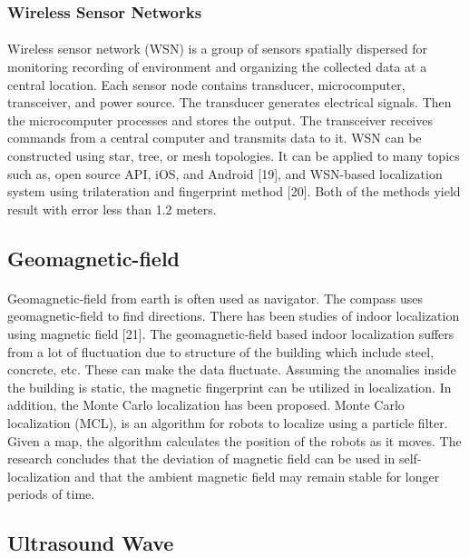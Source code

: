 \subsubsection{Wireless Sensor Networks}
\paragraph{} Wireless sensor network (WSN) is a group of sensors spatially dispersed for monitoring recording of environment and organizing the collected data at a central location. Each sensor node contains transducer, microcomputer, transceiver, and power source. The transducer generates electrical signals. Then the microcomputer processes and stores the output. The transceiver receives commands from a central computer and transmits data to it. WSN can be constructed using star, tree, or mesh topologies. It can be applied to many topics such as, open source API, iOS, and Android [19], and WSN-based localization system using trilateration and fingerprint method [20]. Both of the methods yield result with error less than 1.2 meters.

\subsection{Geomagnetic-field}
\paragraph{} Geomagnetic-field from earth is often used as navigator. The compass uses geomagnetic-field to find directions. There has been studies of indoor localization using magnetic field [21]. The geomagnetic-field based indoor localization suffers from a lot of fluctuation due to structure of the building which include steel, concrete, etc. These can make the data fluctuate. Assuming the anomalies inside the building is static, the magnetic fingerprint can be utilized in localization. In addition, the Monte Carlo localization has been proposed. Monte Carlo localization (MCL), is an algorithm for robots to localize using a particle filter. Given a map, the algorithm calculates the position of the robots as it moves. The research concludes that the deviation of magnetic field can be used in self-localization and that the ambient magnetic field may remain stable for longer periods of time.

\subsection{Ultrasound Wave}
